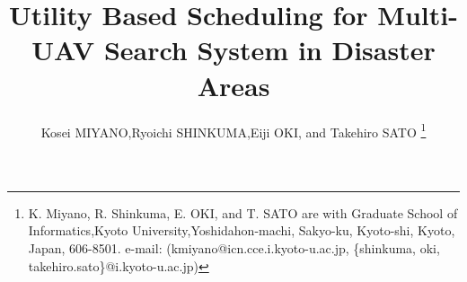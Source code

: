 \documentclass[journal]{IEEEtran}
\begin{document}
%
\title{Utility Based Scheduling for Multi-UAV Search System in Disaster Areas}
%
%
%

\author{Kosei MIYANO,Ryoichi SHINKUMA,Eiji OKI, and Takehiro SATO
\thanks{K. Miyano, R. Shinkuma, E. OKI, and T. SATO are with Graduate School of
Informatics,Kyoto University,Yoshidahon-machi, Sakyo-ku, Kyoto-shi,
Kyoto, Japan, 606-8501.
e-mail: (kmiyano@icn.cce.i.kyoto-u.ac.jp, \{shinkuma, oki, takehiro.sato\}@i.kyoto-u.ac.jp)}}

% 
%
\end{document}
